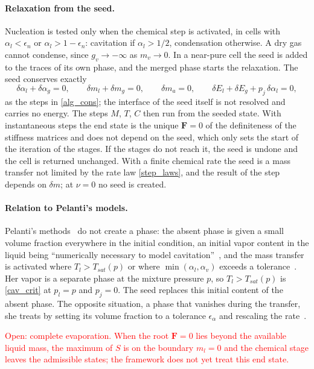 \paragraph{Relaxation from the seed.}
Nucleation is tested only when the chemical step is activated, in cells with $\alpha_l<\epsilon_n$ or $\alpha_l>1-\epsilon_n$: cavitation if $\alpha_l>1/2$, condensation otherwise. A dry gas cannot condense, since $g_v\to-\infty$ as $m_v\to0$. In a near-pure cell the seed is added to the traces of its own phase, and the merged phase starts the relaxation. The seed conserves exactly
\begin{equation}\label{nuc_cons}
\delta\alpha_l+\delta\alpha_g=0,\qquad \delta m_l+\delta m_g=0,\qquad \delta m_a=0,\qquad \delta E_l+\delta E_g+p_{j}\,\delta\alpha_l=0,
\end{equation}
as the steps in \eqref{alg_cons}; the interface of the seed itself is not resolved and carries no energy. The steps $M$, $T$, $C$ then run from the seeded state. With instantaneous steps the end state is the unique $\boldsymbol{F}=0$ of the definiteness of the stiffness matrices and does not depend on the seed, which only sets the start of the iteration of the stages. If the stages do not reach it, the seed is undone and the cell is returned unchanged. With a finite chemical rate the seed is a mass transfer not limited by the rate law \eqref{step_laws}, and the result of the step depends on $\delta m$; at $\nu=0$ no seed is created.

\paragraph{Relation to Pelanti's models.}
Pelanti's methods~\cite{Pelanti2022,Pelanti2026} do not create a phase: the absent phase is given a small volume fraction everywhere in the initial condition, an initial vapor content in the liquid being ``numerically necessary to model cavitation''~\cite[Sec.~5.1]{Pelanti2026}, and the mass transfer is activated where $T_l>T_{sat}(p)$ or where $\min(\alpha_l,\alpha_v)$ exceeds a tolerance~\cite[Sec.~5]{Pelanti2026}. Her vapor is a separate phase at the mixture pressure $p$, so $T_l>T_{sat}(p)$ is \eqref{cav_crit} at $p_l=p$ and $p_{j}=0$. The seed replaces this initial content of the absent phase. The opposite situation, a phase that vanishes during the transfer, she treats by setting its volume fraction to a tolerance $\epsilon_\alpha$ and rescaling the rate~\cite[eq.~(44)]{Pelanti2026}.

\textcolor{red}{Open: complete evaporation. When the root $\boldsymbol{F}=0$ lies beyond the available liquid mass, the maximum of $S$ is on the boundary $m_l=0$ and the chemical stage leaves the admissible states; the framework does not yet treat this end state.}

